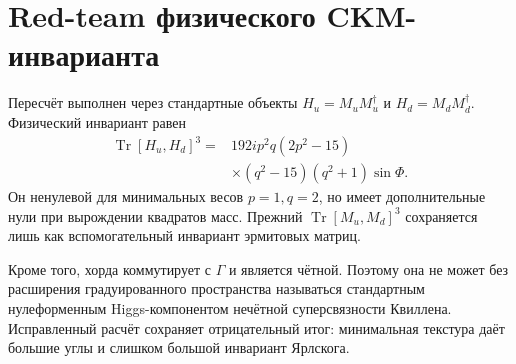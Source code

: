 \section*{Red-team физического CKM-инварианта}

Пересчёт выполнен через стандартные объекты
\(H_u=M_uM_u^\dagger\) и \(H_d=M_dM_d^\dagger\). Физический инвариант равен
\[
 \begin{aligned}
 \operatorname{Tr}[H_u,H_d]^3={}&192ip^2q(2p^2-15)\\
 &\times(q^2-15)(q^2+1)\sin\Phi.
 \end{aligned}
\]
Он ненулевой для минимальных весов \(p=1,q=2\), но имеет дополнительные
нули при вырождении квадратов масс. Прежний \(\operatorname{Tr}[M_u,M_d]^3\)
сохраняется лишь как вспомогательный инвариант эрмитовых матриц.

Кроме того, хорда коммутирует с \(\Gamma\) и является чётной. Поэтому она не
может без расширения градуированного пространства называться стандартным
нулеформенным Higgs-компонентом нечётной суперсвязности Квиллена. Исправленный
расчёт сохраняет отрицательный итог: минимальная текстура даёт большие углы
и слишком большой инвариант Ярлскога.